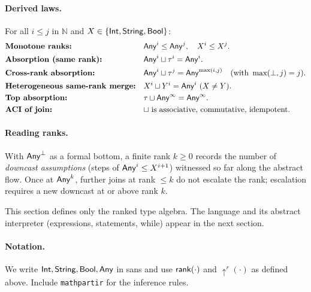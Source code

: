 \paragraph{Derived laws.}
For all $i\le j$ in $\mathbb{N}$ and $X\in\{\mathsf{Int},\mathsf{String},\mathsf{Bool}\}$:
\begin{align*}
&\textbf{Monotone ranks:} && \mathsf{Any}^{i} \le \mathsf{Any}^{j},\quad X^{i} \le X^{j}.\\
&\textbf{Absorption (same rank):} && \mathsf{Any}^{i} \sqcup \tau^{i} = \mathsf{Any}^{i}.\\
&\textbf{Cross-rank absorption:} && \mathsf{Any}^{i} \sqcup \tau^{j} = \mathsf{Any}^{\max(i,j)}\quad(\text{with }\max(\bot,j)=j).\\
&\textbf{Heterogeneous same-rank merge:} && X^{i} \sqcup Y^{i}=\mathsf{Any}^{i}\ (X\neq Y).\\
&\textbf{Top absorption:} && \tau \sqcup \mathsf{Any}^{\infty}=\mathsf{Any}^{\infty}.\\
&\textbf{ACI of join:} && \text{$\sqcup$ is associative, commutative, idempotent.}
\end{align*}

\paragraph{Reading ranks.}
With $\mathsf{Any}^{\bot}$ as a formal bottom, a finite rank $k\ge 0$ records the number of \emph{downcast assumptions} (steps of $\mathsf{Any}^{i}\le X^{i+1}$) witnessed so far along the abstract flow.
Once at $\mathsf{Any}^{k}$, further joins at rank $\le k$ do not escalate the rank; escalation requires a new downcast at or above rank $k$.

\medskip
This section defines only the ranked type algebra.
The language and its abstract interpreter (expressions, statements, \textsf{while}) appear in the next section.

\paragraph*{Notation.}
We write $\mathsf{Int},\mathsf{String},\mathsf{Bool},\mathsf{Any}$ in \textsf{sans} and use
$\mathsf{rank}(\cdot)$ and $\uparrow^{r}(\cdot)$ as defined above.
Include \texttt{mathpartir} for the inference rules.
